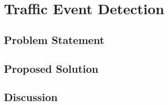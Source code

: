 \documentclass[a4paper,portrait,12pt]{article}
\begin{document}
\section{Traffic Event Detection}
\subsection{Problem Statement}
\subsection{Proposed Solution}
\subsection{Discussion}

\newpage
\nocite{*}


\end{document}
